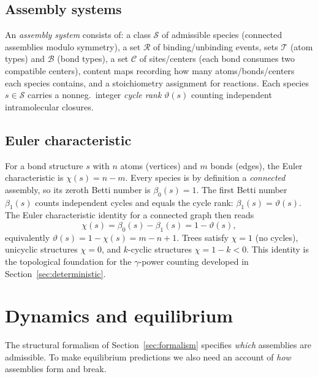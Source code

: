 \documentclass[11pt]{amsart}
\newcommand{\Species}{\mathcal{S}}
\newcommand{\Reactions}{\mathcal{R}}
\newcommand{\Bonds}{\mathcal{B}}
\newcommand{\Atoms}{\mathcal{T}}
\newcommand{\Centers}{\mathcal{C}}
\theoremstyle{definition}
\theoremstyle{plain}
\theoremstyle{remark}
\begin{document}
\subsection{Assembly systems}
\label{sec:assembly-systems-data}

An \emph{assembly system} consists of:
a class $\Species$ of admissible species (connected assemblies modulo symmetry),
a set $\Reactions$ of binding/unbinding events,
sets $\Atoms$ (atom types) and $\Bonds$ (bond types),
a set $\Centers$ of sites/centers (each bond consumes two compatible centers),
content maps recording how many atoms/bonds/centers each species contains,
and a stoichiometry assignment for reactions.
Each species $s\in\Species$ carries a nonneg.\ integer \emph{cycle rank} $\vartheta(s)$ counting independent intramolecular closures.

\subsection{Euler characteristic}
\label{sec:euler-characteristic}

For a bond structure $s$ with $n$ atoms (vertices) and $m$ bonds (edges), the Euler characteristic is $\chi(s) = n - m$.
Every species is by definition a \emph{connected} assembly, so its zeroth Betti number is $\beta_0(s) = 1$.
The first Betti number $\beta_1(s)$ counts independent cycles and equals the cycle rank: $\beta_1(s) = \vartheta(s)$.
The Euler characteristic identity for a connected graph then reads
\begin{equation}\label{eq:euler_identity}
\chi(s) = \beta_0(s) - \beta_1(s) = 1 - \vartheta(s),
\end{equation}
equivalently $\vartheta(s) = 1 - \chi(s) = m - n + 1$.
Trees satisfy $\chi=1$ (no cycles), unicyclic structures $\chi=0$, and $k$-cyclic structures $\chi = 1-k < 0$.
This identity is the topological foundation for the $\gamma$-power counting developed in Section~\ref{sec:deterministic}.


\section{Dynamics and equilibrium}
\label{sec:dynamics}

The structural formalism of Section~\ref{sec:formalism} specifies \emph{which} assemblies are admissible.
To make equilibrium predictions we also need an account of \emph{how} assemblies form and break.
\end{document}
